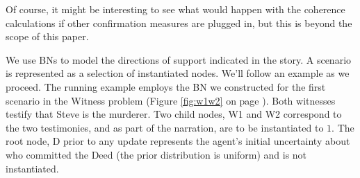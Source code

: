 \documentclass[10pt,]{scrartcl}
\begin{document}
\noindent Of course, it might be interesting to see what would happen
with the coherence calculations if other confirmation measures are
plugged in, but this is beyond the scope of this paper.

We use BNs to model the directions of support indicated in the story. A
scenario is represented as a selection of instantiated nodes. We'll
follow an example as we proceed. The running example employs the BN we
constructed for the first scenario in the \textsf{Witness} problem
(Figure \ref{fig:w1w2} on page \pageref{fig:w1w2}). Both witnesses
testify that Steve is the murderer. Two child nodes, \textsf{W1} and
\textsf{W2} correspond to the two testimonies, and as part of the
narration, are to be instantiated to \(1\). The root node, \textsf{D}
prior to any update represents the agent's initial uncertainty about who
committed the Deed (the prior distribution is uniform) and is not
instantiated.
\end{document}
